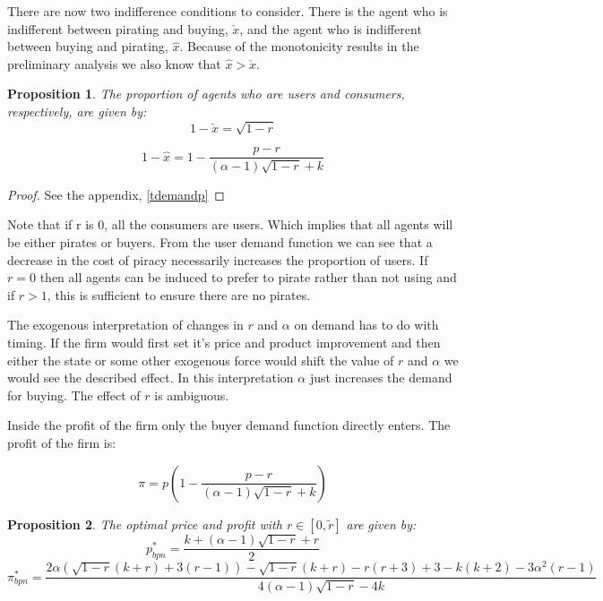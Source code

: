 \documentclass[12pt]{report}
\newtheorem{proposition}{Proposition}
\numberwithin{equation}{section}
\begin{document}
There are now two indifference conditions to consider. There is the agent who is indifferent between pirating and buying, $\check{x}$, and the agent who is indifferent between buying and pirating, $\hat{x}$. Because of the monotonicity results in the preliminary analysis we also know that $\hat{x}>\check{x}$.  

\begin{proposition}\label{tdemand}
The proportion of agents who are users and consumers, respectively, are given by:
\begin{equation}\label{eq:1}
1 -\check{x} = \sqrt{1-r}
\end{equation}

\begin{equation}\label{eq:2}
1 - \hat{x}= 1 - \frac{p-r}{(\alpha - 1) \sqrt{1-r} +k}
\end{equation}


\end{proposition}

\begin{proof}
See the appendix, \ref{tdemandp}
\end{proof}

Note that if r is 0, all the consumers are users. Which implies that all agents will be either pirates or buyers. From the user demand function we can see that a decrease in the cost of piracy necessarily increases the proportion of users. If $r=0$ then all agents can be induced to prefer to pirate rather than not using and if $r>1$, this is sufficient to ensure there are no pirates. 

The exogenous interpretation of changes in $r$ and $\alpha$ on demand has to do with timing. If the firm would first set it's price and product improvement and then either the state or some other exogenous force would shift the value of $r$ and $\alpha$ we would see the described effect. In this interpretation $\alpha$ just increases the demand for buying. The effect of $r$ is ambiguous. 

Inside the profit of the firm only the buyer demand function directly enters. The profit of the firm is: 

\begin{equation*}
\pi = p\left( 
1 - \frac{p-r}{(\alpha - 1) \sqrt{1-r} +k}
\right) 
\end{equation*}

\begin{proposition}
The optimal price and profit with $r \in[0, \tilde{r}]$ are given by:
\begin{equation}\label{TNB}
p_{bpn}^* = \frac{k+ (\alpha-1)\sqrt{ 1 -r }+r}{2}
\end{equation}
\begin{equation}
\pi_{bpn}^* = \frac{2 \alpha \left( \sqrt{1-r}(k+r)+3(r-1) \right)-\sqrt{1-r}(k+r)-r(r+3)+3-k(k+2)-3 \alpha^2 (r-1)}{4 (  \alpha -1 ) \sqrt{1-r}-4 k }
\end{equation}
\end{proposition}
\end{document}
